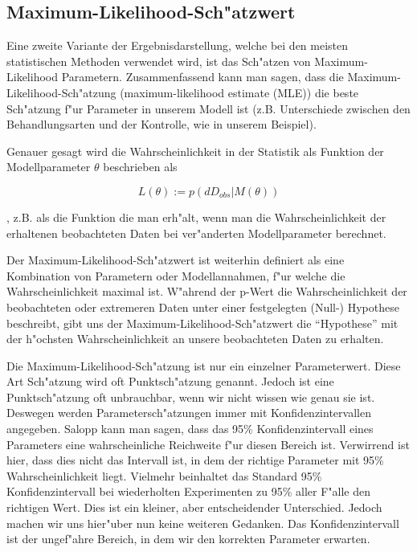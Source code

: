 \documentclass[a4paper,twoside]{tufte-book}\usepackage[]{graphicx}\usepackage[]{color}
\begin{document}
\subsection{Maximum-Likelihood-Sch"atzwert}

Eine zweite Variante der Ergebnisdarstellung, welche bei den meisten statistischen Methoden verwendet wird, ist das Sch"atzen von Maximum-Likelihood Parametern. Zusammenfassend kann man sagen, dass die Maximum-Likelihood-Sch"atzung (maximum-likelihood estimate (MLE)) die beste Sch"atzung f"ur Parameter in unserem Modell ist (z.B. Unterschiede zwischen den Behandlungsarten und der Kontrolle, wie in unserem Beispiel).


Genauer gesagt wird die Wahrscheinlichkeit in der Statistik als Funktion der Modellparameter $\theta$ beschrieben als

\begin{equation}
L(\theta) := p(dD_{obs} | M(\theta))
\end{equation}

, z.B. als die Funktion die man erh"alt, wenn man die Wahrscheinlichkeit der erhaltenen beobachteten Daten bei ver"anderten Modellparameter berechnet.

Der Maximum-Likelihood-Sch"atzwert ist weiterhin definiert als eine Kombination von Parametern oder Modellannahmen, f"ur welche die Wahrscheinlichkeit maximal ist. W"ahrend der p-Wert die Wahrscheinlichkeit der beobachteten 
oder extremeren Daten unter einer festgelegten (Null-) Hypothese beschreibt, gibt uns der Maximum-Likelihood-Sch"atzwert die "`Hypothese"' mit der h"ochsten Wahrscheinlichkeit an unsere beobachteten Daten zu erhalten.

Die Maximum-Likelihood-Sch"atzung ist nur ein einzelner Parameterwert. Diese Art Sch"atzung wird oft Punktsch"atzung genannt. Jedoch ist eine Punktsch"atzung oft unbrauchbar, wenn wir nicht wissen wie genau sie ist. Deswegen werden Parametersch"atzungen immer mit Konfidenzintervallen angegeben. Salopp kann man sagen, dass das 95\% Konfidenzintervall eines Parameters eine wahrscheinliche Reichweite f"ur diesen Bereich ist. Verwirrend ist hier, dass dies nicht das Intervall ist, in dem der richtige Parameter mit 95\% Wahrscheinlichkeit liegt. Vielmehr beinhaltet das Standard 95\% Konfidenzintervall bei wiederholten Experimenten zu 95\% aller F"alle den richtigen Wert. Dies ist ein kleiner, aber entscheidender Unterschied. Jedoch machen wir uns hier"uber nun keine weiteren Gedanken. Das Konfidenzintervall ist der ungef"ahre Bereich, in dem wir den korrekten Parameter erwarten. 
\end{document}
